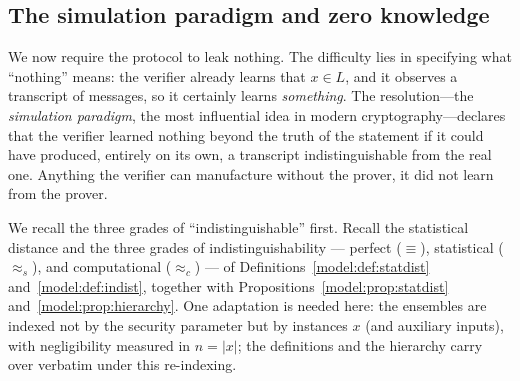 \documentclass[11pt,a4paper]{article}
\theoremstyle{definition}
\theoremstyle{remark}
\begin{document}
\subsection{The simulation paradigm and zero knowledge}\label{zk:subsec:zk}

We now require the protocol to leak nothing. The difficulty lies in specifying what ``nothing'' means: the verifier already learns that \(x\in L\), and it observes a transcript of messages, so it certainly learns \emph{something}. The resolution---the \emph{simulation paradigm}, the most influential idea in modern cryptography---declares that the verifier learned nothing beyond the truth of the statement if it could have produced, entirely on its own, a transcript indistinguishable from the real one. Anything the verifier can manufacture without the prover, it did not learn from the prover.

We recall the three grades of ``indistinguishable'' first. Recall the statistical distance and the three grades of indistinguishability --- perfect (\(\equiv\)), statistical (\(\approx_s\)), and computational (\(\approx_c\)) --- of Definitions~\ref{model:def:statdist} and~\ref{model:def:indist}, together with Propositions~\ref{model:prop:statdist} and~\ref{model:prop:hierarchy}. One adaptation is needed here: the ensembles are indexed not by the security parameter but by instances \(x\) (and auxiliary inputs), with negligibility measured in \(n = |x|\); the definitions and the hierarchy carry over verbatim under this re-indexing.
\end{document}
